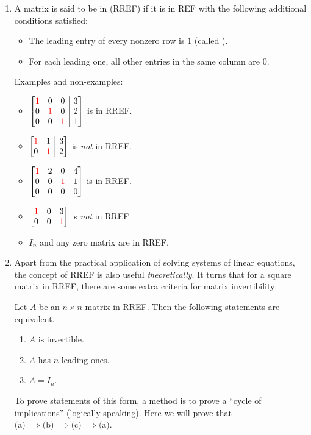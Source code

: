 \begin{enumerate}
\item A matrix is said to be in  (RREF) if it is
in REF with the following additional conditions satisfied:
\begin{itemize}
\item The leading entry of every nonzero row is \(1\) (called ).
\item For each leading one, all other entries in the same column are \(0\).
\end{itemize}
Examples and non-examples:
\begin{itemize}
\item \(
\left[\begin{array}{@{}ccc|c@{}}
\rc{1}&0&0&3\\
0&\rc{1}&0&2\\
0&0&\rc{1}&1\\
\end{array}\right]
\) is in RREF.

\item \(
\left[\begin{array}{@{}cc|c@{}}
\rc{1}&1&3\\
0&\rc{1}&2
\end{array}\right]
\) is \emph{not} in RREF.

\item \(\mqty[\rc{1}&2&0&4\\ 0&0&\rc{1}&1\\ 0&0&0&0]\) is in RREF.
\item \(\mqty[\rc{1}&0&3\\ 0&0&\rc{1}]\) is \emph{not} in RREF.

\item \(I_n\) and any zero matrix are in RREF.
\end{itemize}

\item Apart from the practical application of solving systems of linear
equations, the concept of RREF is also useful \emph{theoretically}. It turns
that for a square matrix in RREF, there are some extra criteria for
matrix invertibility:
\begin{theorem}
\label{thm:rref-matx-inv-equiv}
Let \(A\) be an \(n\times n\) matrix in RREF. Then the following statements are
equivalent.
\begin{enumerate}
\item \(A\) is invertible.
\item \(A\) has \(n\) leading ones.
\item \(A=I_n\).
\end{enumerate}
\end{theorem}
\begin{pf}
To prove statements of this form, a method is to prove a ``cycle of
implications'' (logically speaking). Here we will prove that
\(\text{(a)}\implies \text{(b)}\implies \text{(c)}\implies \text{(a)}\).


\end{pf}
\end{enumerate}
